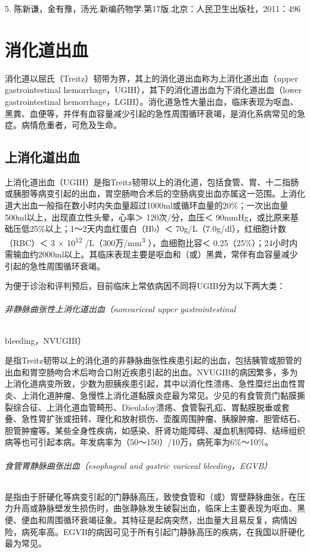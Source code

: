 5.
陈新谦，金有豫，汤光.新编药物学.第17版.北京：人民卫生出版社，2011：496

\protect\hypertarget{text00032.html}{}{}

\chapter{消化道出血}

消化道以屈氏（Treitz）韧带为界，其上的消化道出血称为上消化道出血（upper
gastrointestinal
hemorrhage，UGIH），其下的消化道出血为下消化道出血（lower
gastrointestinal
hemorrhage，LGIH）。消化道急性大量出血，临床表现为呕血、黑粪、血便等，并伴有血容量减少引起的急性周围循环衰竭，是消化系病常见的急症。病情危重者，可危及生命。

\section{上消化道出血}

上消化道出血（UGIH）是指Treitz韧带以上的消化道，包括食管、胃、十二指肠或胰胆等病变引起的出血，胃空肠吻合术后的空肠病变出血亦属这一范围。上消化道大出血一般指在数小时内失血量超过1000ml或循环血量的20\%；一次出血量500ml以上，出现直立性头晕，心率＞
120次/分，血压＜
90mmHg，或比原来基础压低25\%以上；1～2天内血红蛋白（Hb）＜
70g/L（7.0g/dl），红细胞计数（RBC）＜ 3 × 10\textsuperscript{12}
/L（300万/mm\textsuperscript{3} ），血细胞比容＜
0.25（25\%）；24小时内需输血约2000ml以上。其临床表现主要是呕血和（或）黑粪，常伴有血容量减少引起的急性周围循环衰竭。

为便于诊治和评判预后，目前临床上常依病因不同将UGIB分为以下两大类：

\subparagraph{非静脉曲张性上消化道出血（nonvariceal upper gastrointestinal}
bleeding，NVUGIB）

是指Treitz韧带以上的消化道的非静脉曲张性疾患引起的出血，包括胰管或胆管的出血和胃空肠吻合术后吻合口附近疾患引起的出血。NVUGIB的病因繁多，多为上消化道病变所致，少数为胆胰疾患引起，其中以消化性溃疡、急性糜烂出血性胃炎、上消化道肿瘤、急慢性上消化道黏膜炎症最为常见。少见的有食管贲门黏膜撕裂综合征、上消化道血管畸形、Dieulafoy溃疡、食管裂孔疝、胃黏膜脱垂或套叠、急性胃扩张或扭转、理化和放射损伤、壶腹周围肿瘤、胰腺肿瘤、胆管结石、胆管肿瘤等。某些全身性疾病，如感染、肝肾功能障碍、凝血机制障碍、结缔组织病等也可引起本病。年发病率为（50～150）/10万，病死率为6\%～10\%。

\subparagraph{食管胃静脉曲张出血（esophageal and gastric variceal bleeding，EGVB）}

是指由于肝硬化等病变引起的门静脉高压，致使食管和（或）胃壁静脉曲张，在压力升高或静脉壁发生损伤时，曲张静脉发生破裂出血，临床上主要表现为呕血、黑便、便血和周围循环衰竭征象。其特征是起病突然，出血量大且易反复，病情凶险，病死率高。EGVB的病因可见于所有引起门静脉高压的疾病，在我国以肝硬化最为常见。

